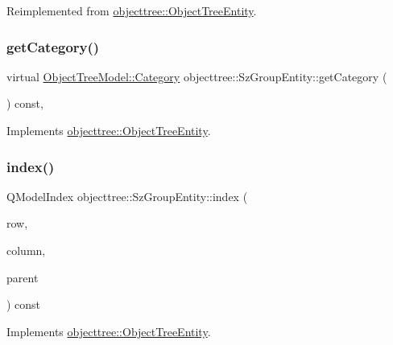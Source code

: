 Reimplemented from \mbox{\hyperlink{classobjecttree_1_1_object_tree_entity_a71042bfb5a8328bcbde9d283c0b1b28c}{objecttree\+::\+Object\+Tree\+Entity}}.

\mbox{\label{classobjecttree_1_1_sz_group_entity_a1332a46cbd951c96c77c389e524f3846}} 
\subsubsection{\texorpdfstring{getCategory()}{getCategory()}}
{\footnotesize\ttfamily virtual \mbox{\hyperlink{class_object_tree_model_a379e9d6b0d381853785adf62095ba4e3}{Object\+Tree\+Model\+::\+Category}} objecttree\+::\+Sz\+Group\+Entity\+::get\+Category (\begin{DoxyParamCaption}{ }\end{DoxyParamCaption}) const\hspace{0.3cm}{\ttfamily [inline]}, {\ttfamily [virtual]}}



Implements \mbox{\hyperlink{classobjecttree_1_1_object_tree_entity_aa4e80e7fa80672c1b9902add665abc77}{objecttree\+::\+Object\+Tree\+Entity}}.

\mbox{\label{classobjecttree_1_1_sz_group_entity_ac467abe2de104e9f99c0e1520d4a2053}} 
\subsubsection{\texorpdfstring{index()}{index()}}
{\footnotesize\ttfamily Q\+Model\+Index objecttree\+::\+Sz\+Group\+Entity\+::index (\begin{DoxyParamCaption}\item[{int}]{row,  }\item[{int}]{column,  }\item[{const Q\+Model\+Index \&}]{parent }\end{DoxyParamCaption}) const\hspace{0.3cm}{\ttfamily [virtual]}}



Implements \mbox{\hyperlink{classobjecttree_1_1_object_tree_entity_a9ccaab3b27e65b1ed8b22f00c57a1082}{objecttree\+::\+Object\+Tree\+Entity}}.

